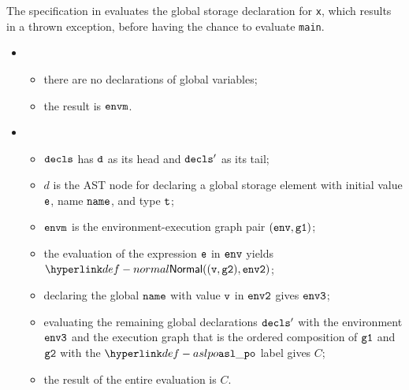 
The specification in  evaluates the
global storage declaration for \verb|x|, which results in a thrown exception,
before having the chance to evaluate \verb|main|.

\ProseParagraph
\OneApplies
\begin{itemize}
  \item {}
  \begin{itemize}
    \item there are no declarations of global variables;
    \item the result is $\envm$.
  \end{itemize}

  \item {}
  \begin{itemize}
    \item $\vdecls$ has $\vd$ as its head and $\vdecls'$ as its tail;
    \item $d$ is the AST node for declaring a global storage element with initial value $\ve$,
          name $\name$, and type $\vt$;
    \item $\envm$ is the environment-execution graph pair $(\env, \vgone)$;
    \item the evaluation of the expression $\ve$ in $\env$ yields $\Normal((\vv, \vgtwo), \envtwo)$\ProseOrAbnormal;
    \item declaring the global $\name$ with value $\vv$ in $\envtwo$ gives $\envthree$;
    \item evaluating the remaining global declarations $\vdecls'$ with the environment $\envthree$ and the execution graph
          that is the ordered composition of $\vgone$ and $\vgtwo$ with the $\aslpo$ label gives $C$;
    \item the result of the entire evaluation is $C$.
  \end{itemize}
\end{itemize}

\FormallyParagraph
\begin{mathpar}
\end{mathpar}


